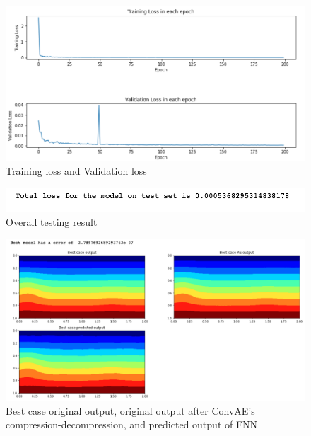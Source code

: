 \begin{figure}[H]
    \caption{Training loss and Validation loss}
    \includegraphics[scale=0.6]{figures/mantle_convection_images/larger_dataset_interpolated/FNN_trainingData.png}
\end{figure}

\begin{figure}[H]
    \caption{Overall testing result}
    \includegraphics[scale=0.8]{figures/mantle_convection_images/larger_dataset_interpolated/FNN_OverallTesting.png}
\end{figure}

\begin{figure}[H]
    \caption{Best case original output, original output after ConvAE's compression-decompression, and predicted output of FNN}
    \includegraphics[scale=0.5]{figures/mantle_convection_images/larger_dataset_interpolated/FNN_Best.png}
\end{figure}

